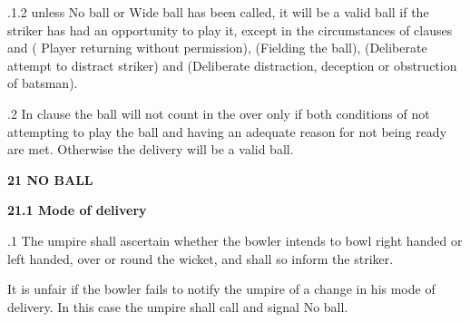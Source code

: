 \documentclass[12pt]{article}
\begin{document}
\vspace{\baselineskip}
\begin{adjustwidth}{1.18in}{0.0in}
{\fontsize{9pt}{10.8pt}.1.2 \tabto{1.17in} unless No ball or Wide ball has been called, it will be a valid ball if the striker has had an opportunity to play it, except in the circumstances of clauses and ( Player returning without permission), (Fielding the ball), (Deliberate attempt to distract striker) and (Deliberate distraction, deception or obstruction of batsman).\par}\par

\end{adjustwidth}


\vspace{\baselineskip}
\begin{adjustwidth}{0.5in}{0.11in}
{\fontsize{9pt}{10.8pt}.2 \tabto{0.49in} In clause the ball will not count in the over only if both conditions of not attempting to play the ball and having an adequate reason for not being ready are met. Otherwise the delivery will be a valid ball.\par}\par

\end{adjustwidth}


\vspace{\baselineskip}
{\fontsize{16pt}{19.2pt}\selectfont \textbf{21 NO BALL}\par}\par


\vspace{\baselineskip}
{\fontsize{11pt}{13.2pt}\selectfont \textbf{21.1 \tabto{0.47in} Mode of delivery}\par}\par


\vspace{\baselineskip}
\begin{adjustwidth}{0.5in}{0.03in}
{\fontsize{9pt}{10.8pt}.1 \tabto{0.49in} The umpire shall ascertain whether the bowler intends to bowl right handed or left handed, over or round the wicket, and shall so inform the striker.\par}\par

\end{adjustwidth}


\vspace{\baselineskip}
\begin{adjustwidth}{0.5in}{0.1in}
{\fontsize{9pt}{10.8pt}\selectfont It is unfair if the bowler fails to notify the umpire of a change in his mode of delivery. In this case the umpire shall call and signal No ball.\par}\par

\end{adjustwidth}
\end{document}
